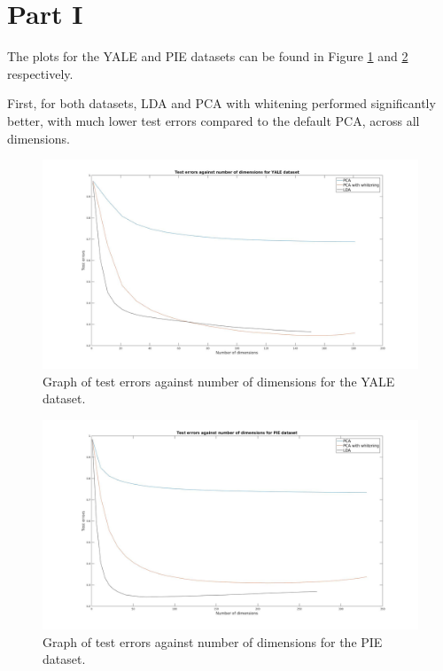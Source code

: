 \documentclass[12pt,twoside]{article}
\begin{document}


\section*{Part I}

The plots for the YALE and PIE datasets can be found in Figure \ref{fig:part1YALE} and \ref{fig:part1PIE} respectively.

First, for both datasets, LDA and PCA with whitening performed significantly better, with much lower test errors compared to the default PCA, across all dimensions. 

\begin{figure}
  \centering
    \includegraphics[scale = 0.26]{./figures/YALE.jpg}
  \caption{Graph of test errors against number of dimensions for the YALE dataset.}
  \label{fig:part1YALE}
\end{figure}

\begin{figure}
  \centering
    \includegraphics[scale = 0.26]{./figures/PIE.jpg}
  \caption{Graph of test errors against number of dimensions for the PIE dataset.}
  \label{fig:part1PIE}
\end{figure}
\end{document}
